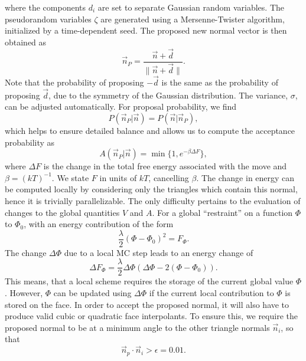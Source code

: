 \documentclass[twocolumn]{biophys-new}
\begin{document}
where the components $d_i$ are set to separate Gaussian random variables. The pseudorandom variables $\zeta$ are generated using a Mersenne-Twister algorithm, initialized by a time-dependent seed. The proposed new normal vector is then obtained as 
\begin{equation}
 \vec{n}_P = \frac{\vec{n} + \vec{d}}{\| \vec{n} + \vec{d} \|}.  
\end{equation}
Note that the probability of proposing $-\vec{d}$ is the same as the probability of proposing $\vec{d}$, due to the symmetry of the Gaussian distribution. The variance, $\sigma$, can be adjusted automatically. For proposal probability, we find
\begin{equation}
\label{eq:reverse}
 P(\vec{n}_P  | \vec{n} )   = P(\vec{n}  | \vec{n}_P),  
\end{equation}
which helps to ensure detailed balance and allows us to compute the acceptance probability as
\begin{equation}
\label{eq:accept}
 A(\vec{n}_P | \vec{n} ) = \min \big\{ 1, e^{- \beta \Delta F} \big\}, 
\end{equation}
where $\Delta F$ is the change in the total free
energy
associated with the move and $\beta = (kT)^{-1}$. We state $F$ in units of $kT$, cancelling $\beta$. The change in energy can be computed locally by considering only the triangles which contain this normal, hence it is trivially parallelizable.
The only difficulty 
pertains to the evaluation of changes
to the global quantities $V$ and $A$.
For a global ``restraint'' on a function $\Phi$ to $\Phi_0$, with an energy contribution of the form 
\begin{equation}
 \frac{\lambda}{2}(\Phi-\Phi_0)^2 = F_\Phi. 
\end{equation}
The change $\Delta \Phi$ due to a local MC step leads to an energy change of
\begin{equation}
  \Delta F_\Phi = \frac{\lambda}{2}\Delta \Phi(\Delta \Phi-2(\Phi-\Phi_0)). 
  \label{eq:global}
\end{equation}
This means, that a local scheme requires the storage of the current global value $\Phi$. However, $\Phi$ can be updated  using $\Delta \Phi$ if the current local contribution to $\Phi$ is stored on the face. In order to accept the proposed normal, it will also have to produce valid cubic or quadratic face interpolants.
To ensure this, we require the proposed normal to be at a minimum angle to the other triangle normals $\vec{n}_i$, so that
\begin{equation}
 \vec{n}_p \cdot \vec{n}_i > \epsilon = 0.01.  
\end{equation}
\end{document}
